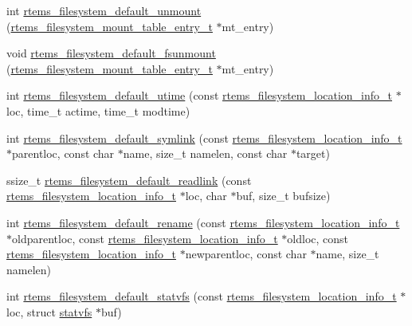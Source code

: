 \begin{DoxyCompactItemize}
\item 
int \mbox{\hyperlink{group__LibIOFSOps_ga0fe302d1177a5be4f6b69110240cb08a}{rtems\+\_\+filesystem\+\_\+default\+\_\+unmount}} (\mbox{\hyperlink{structrtems__filesystem__mount__table__entry__tt}{rtems\+\_\+filesystem\+\_\+mount\+\_\+table\+\_\+entry\+\_\+t}} $\ast$mt\+\_\+entry)
\item 
void \mbox{\hyperlink{group__LibIOFSOps_ga8ccbdac4957138c89d1ca6000f4e7382}{rtems\+\_\+filesystem\+\_\+default\+\_\+fsunmount}} (\mbox{\hyperlink{structrtems__filesystem__mount__table__entry__tt}{rtems\+\_\+filesystem\+\_\+mount\+\_\+table\+\_\+entry\+\_\+t}} $\ast$mt\+\_\+entry)
\item 
int \mbox{\hyperlink{group__LibIOFSOps_ga3c2daf1a049f27cbaa4ce8726b519a11}{rtems\+\_\+filesystem\+\_\+default\+\_\+utime}} (const \mbox{\hyperlink{group__LibIO_ga3252b3d31ee3c49ffff0b7604a676864}{rtems\+\_\+filesystem\+\_\+location\+\_\+info\+\_\+t}} $\ast$loc, time\+\_\+t actime, time\+\_\+t modtime)
\item 
int \mbox{\hyperlink{group__LibIOFSOps_gab04c987aeb43aca10df08f0d20d3c462}{rtems\+\_\+filesystem\+\_\+default\+\_\+symlink}} (const \mbox{\hyperlink{group__LibIO_ga3252b3d31ee3c49ffff0b7604a676864}{rtems\+\_\+filesystem\+\_\+location\+\_\+info\+\_\+t}} $\ast$parentloc, const char $\ast$name, size\+\_\+t namelen, const char $\ast$target)
\item 
ssize\+\_\+t \mbox{\hyperlink{group__LibIOFSOps_gaebd8dda0956f23082c6d9cb151d3db8c}{rtems\+\_\+filesystem\+\_\+default\+\_\+readlink}} (const \mbox{\hyperlink{group__LibIO_ga3252b3d31ee3c49ffff0b7604a676864}{rtems\+\_\+filesystem\+\_\+location\+\_\+info\+\_\+t}} $\ast$loc, char $\ast$buf, size\+\_\+t bufsize)
\item 
int \mbox{\hyperlink{group__LibIOFSOps_ga2338baaf387fcb88acd1ea1abe897bd4}{rtems\+\_\+filesystem\+\_\+default\+\_\+rename}} (const \mbox{\hyperlink{group__LibIO_ga3252b3d31ee3c49ffff0b7604a676864}{rtems\+\_\+filesystem\+\_\+location\+\_\+info\+\_\+t}} $\ast$oldparentloc, const \mbox{\hyperlink{group__LibIO_ga3252b3d31ee3c49ffff0b7604a676864}{rtems\+\_\+filesystem\+\_\+location\+\_\+info\+\_\+t}} $\ast$oldloc, const \mbox{\hyperlink{group__LibIO_ga3252b3d31ee3c49ffff0b7604a676864}{rtems\+\_\+filesystem\+\_\+location\+\_\+info\+\_\+t}} $\ast$newparentloc, const char $\ast$name, size\+\_\+t namelen)
\item 
int \mbox{\hyperlink{group__LibIOFSOps_gab61aa6a004147ff2c28fd3d0b105928c}{rtems\+\_\+filesystem\+\_\+default\+\_\+statvfs}} (const \mbox{\hyperlink{group__LibIO_ga3252b3d31ee3c49ffff0b7604a676864}{rtems\+\_\+filesystem\+\_\+location\+\_\+info\+\_\+t}} $\ast$loc, struct \mbox{\hyperlink{structstatvfs}{statvfs}} $\ast$buf)
\end{DoxyCompactItemize}
